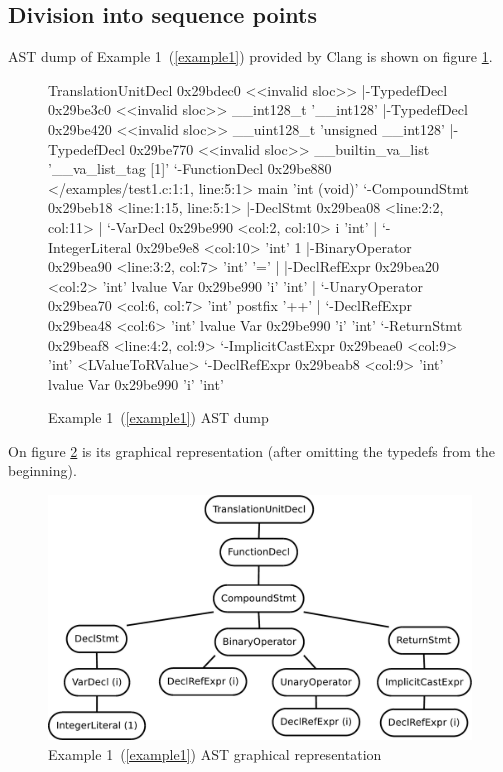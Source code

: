 \subsection{Division into sequence points}
AST dump of Example 1~(\ref{example1}) provided by Clang is shown on figure \ref{ASTdump}.
\begin{figure}
\caption{Example 1~(\ref{example1}) AST dump}
\label{ASTdump}
\begin{code}
TranslationUnitDecl 0x29bdec0 <<invalid sloc>>
|-TypedefDecl 0x29be3c0 <<invalid sloc>> __int128_t '__int128'
|-TypedefDecl 0x29be420 <<invalid sloc>> __uint128_t 'unsigned __int128'
|-TypedefDecl 0x29be770 <<invalid sloc>> __builtin_va_list '__va_list_tag [1]'
`-FunctionDecl 0x29be880 </examples/test1.c:1:1, line:5:1> main 'int (void)'
  `-CompoundStmt 0x29beb18 <line:1:15, line:5:1>
    |-DeclStmt 0x29bea08 <line:2:2, col:11>
    | `-VarDecl 0x29be990 <col:2, col:10> i 'int'
    |   `-IntegerLiteral 0x29be9e8 <col:10> 'int' 1
    |-BinaryOperator 0x29bea90 <line:3:2, col:7> 'int' '='
    | |-DeclRefExpr 0x29bea20 <col:2> 'int' lvalue Var 0x29be990 'i' 'int'
    | `-UnaryOperator 0x29bea70 <col:6, col:7> 'int' postfix '++'
    |   `-DeclRefExpr 0x29bea48 <col:6> 'int' lvalue Var 0x29be990 'i' 'int'
    `-ReturnStmt 0x29beaf8 <line:4:2, col:9>
      `-ImplicitCastExpr 0x29beae0 <col:9> 'int' <LValueToRValue>
        `-DeclRefExpr 0x29beab8 <col:9> 'int' lvalue Var 0x29be990 'i' 'int'
\end{code}
\end{figure}

On figure \ref{ASTuntagged} is its graphical representation (after omitting the typedefs from the beginning).
\begin{figure}
    \caption{Example 1~(\ref{example1}) AST graphical representation}
    \label{ASTuntagged}
    \centering
        \includegraphics[width=1\textwidth]{fig/example1G.pdf}
\end{figure}

